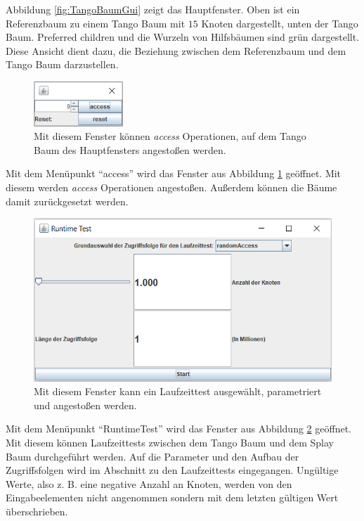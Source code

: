 \documentclass[a4paper,12pt]{article}
\begin{document}
\noindent Abbildung \ref{fig:TangoBaumGui} zeigt das Hauptfenster. Oben ist ein Referenzbaum zu einem Tango Baum mit  $15$ Knoten dargestellt, unten der Tango Baum. Preferred children und die Wurzeln von Hilfsbäumen sind grün dargestellt.
Diese Ansicht dient dazu, die Beziehung zwischen dem Referenzbaum und dem Tango Baum darzustellen.

\begin{figure}[H]
	\centering
	\includegraphics[width=0.3\textwidth]{Medien/laufzeittest/accessGUI}
	\caption{Mit diesem Fenster können  \textit{access} Operationen, auf dem Tango Baum des Hauptfensters angestoßen werden.}
	\label{fig:accessGui}
\end{figure}
\noindent Mit dem Menüpunkt \enquote{access} wird das Fenster aus Abbildung \ref{fig:accessGui} geöffnet. Mit diesem werden \textit{access} Operationen angestoßen. Außerdem können die Bäume damit zurückgesetzt werden.

\begin{figure}[H]
	\centering
	\includegraphics[width=1\textwidth]{Medien/laufzeittest/RuntimeGui}
	\caption{Mit diesem Fenster kann ein Laufzeittest ausgewählt, parametriert und angestoßen werden.}
	\label{fig:RuntimeGui}
\end{figure}

\noindent Mit dem Menüpunkt \enquote{RuntimeTest} wird das Fenster aus Abbildung \ref{fig:RuntimeGui} geöffnet. Mit diesem können Laufzeittests zwischen dem Tango Baum und dem Splay Baum  durchgeführt werden. Auf die Parameter und den Aufbau der Zugriffsfolgen wird im Abschnitt zu den Laufzeittests eingegangen. Ungültige Werte, also z. B. eine negative Anzahl an Knoten, werden von den Eingabeelementen nicht angenommen sondern mit dem letzten gültigen Wert überschrieben.
\end{document}
